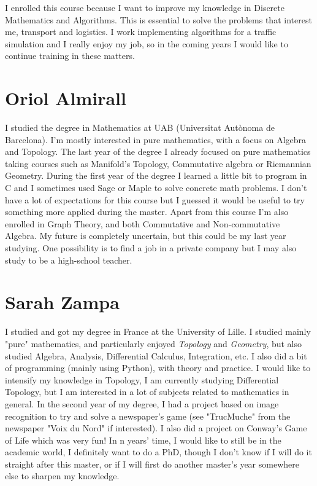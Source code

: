 \documentclass[11pt]{amsart}
\begin{document}
I enrolled this course because I want to improve my knowledge in Discrete Mathematics and Algorithms. This is essential to solve the problems that interest me, transport and logistics.
I work implementing algorithms for a traffic simulation and I really enjoy my job, so in the coming years I would like to continue training in these matters.


\medskip

\section*{Oriol Almirall}

I studied the degree in Mathematics at UAB (Universitat Autònoma de Barcelona).
I'm mostly interested in pure mathematics, with a focus on Algebra and Topology.
The last year of the degree I already focused on pure mathematics taking courses such as Manifold's Topology, Commutative algebra or Riemannian Geometry.
During the first year of the degree I learned a little bit to program in \textsc{C} and I sometimes used Sage or Maple to solve concrete math problems.
I don't have a lot of expectations for this course but I guessed it would be useful to try something more applied during the master.
Apart from this course I'm also enrolled in Graph Theory, and both Commutative and Non-commutative Algebra.
My future is completely uncertain, but this could be my last year studying. 
One possibility is to find a job in a private company but I may also study to be a high-school teacher. 

\medskip

\section*{Sarah Zampa}

I studied and got my degree in France at the University of Lille. I studied mainly "pure" mathematics, and particularly enjoyed \textit{Topology} and \textit{Geometry}, but also studied Algebra, Analysis, Differential Calculus, Integration, etc. I also did a bit of programming (mainly using Python), with theory and practice.
I would like to intensify my knowledge in Topology, I am currently studying Differential Topology, but I am interested in a lot of subjects related to mathematics in general.
In the second year of my degree, I had a project based on image recognition to try and solve a newspaper's game (see "TrucMuche" from the newspaper "Voix du Nord" if interested). I also did a project on Conway's Game of Life which was very fun!
In n years' time, I would like to still be in the academic world, I definitely want to do a PhD, though I don't know if I will do it straight after this master, or if I will first do another master's year somewhere else to sharpen my knowledge.
\end{document}
